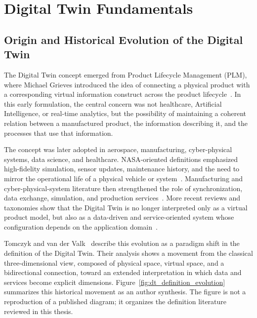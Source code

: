 \chapter{Digital Twin Fundamentals}
\label{chap:dt_fundamentals}

\section{Origin and Historical Evolution of the Digital Twin}
The Digital Twin concept emerged from Product Lifecycle Management (PLM), where Michael Grieves introduced the idea of connecting a physical product with a corresponding virtual information construct across the product lifecycle~\cite{grieves2005product,grieves2014digital,grieves2017digital}. In this early formulation, the central concern was not healthcare, Artificial Intelligence, or real-time analytics, but the possibility of maintaining a coherent relation between a manufactured product, the information describing it, and the processes that use that information.

The concept was later adopted in aerospace, manufacturing, cyber-physical systems, data science, and healthcare. NASA-oriented definitions emphasized high-fidelity simulation, sensor updates, maintenance history, and the need to mirror the operational life of a physical vehicle or system~\cite{shafto2010modeling,glaessgen2012digital}. Manufacturing and cyber-physical-system literature then strengthened the role of synchronization, data exchange, simulation, and production services~\cite{boschert2016digital,negri2017review,kritzinger2018digital,tao2018digitalTwinDriven,tao2019digital}. More recent reviews and taxonomies show that the Digital Twin is no longer interpreted only as a virtual product model, but also as a data-driven and service-oriented system whose configuration depends on the application domain~\cite{jones2020characterising,fuller2020digital,vanderValk2020taxonomy,vanderValk2021archetypes,tomczyk2022paradigm}.

Tomczyk and van der Valk~\cite{tomczyk2022paradigm} describe this evolution as a paradigm shift in the definition of the Digital Twin. Their analysis shows a movement from the classical three-dimensional view, composed of physical space, virtual space, and a bidirectional connection, toward an extended interpretation in which data and services become explicit dimensions. Figure~\ref{fig:dt_definition_evolution} summarizes this historical movement as an author synthesis. The figure is not a reproduction of a published diagram; it organizes the definition literature reviewed in this thesis.

